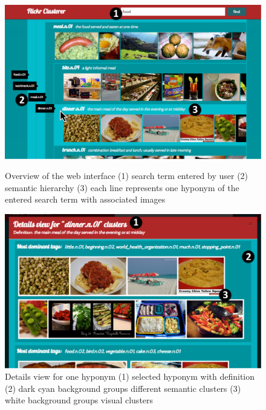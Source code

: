 \begin{figure}[!htb]
    \includegraphics[width=\linewidth]{images/webfrontend-screenshot_1.pdf}
    \caption{Overview of the web interface (1) search term entered by user (2) semantic hierarchy (3) each line represents one hyponym of the entered search term with associated images}\label{fig_webinerface_1}
  \endminipage\hfill
    \includegraphics[width=\linewidth]{images/webfrontend-screenshot_2.pdf}
    \caption{Details view for one hyponym (1) selected hyponym with definition (2) dark cyan background groups different semantic clusters (3) white background groups visual clusters}\label{fig_webinerface_2}
  \endminipage\hfill
\end{figure}

